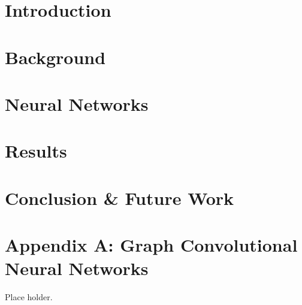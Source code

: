 


	
	\linenumbers
	\newpage
	\section{Introduction}\label{sec:Intro}
	

	\section{Background}\label{sec:BG}
	

	\section{Neural Networks}\label{sec:NN}
	


	\newpage %
	\section{Results}\label{sec:Results}
	

	\section{Conclusion \& Future Work}\label{sec:Conc}
	

	\newpage
	\section{Appendix A: Graph Convolutional Neural Networks}
	Place holder.

	\newpage
	
	


